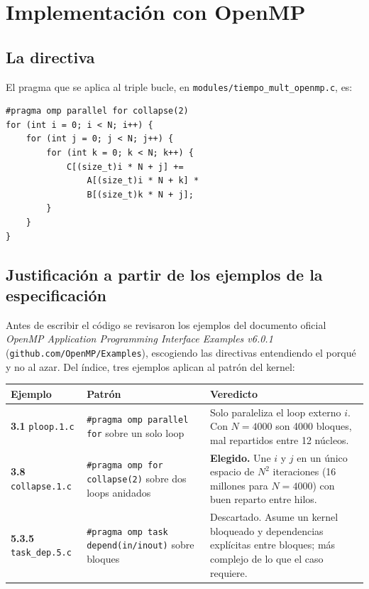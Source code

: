 \section{Implementación con OpenMP}

\subsection{La directiva}

El pragma que se aplica al triple bucle, en \texttt{modules/tiempo\_mult\_openmp.c}, es:

\begin{verbatim}
#pragma omp parallel for collapse(2)
for (int i = 0; i < N; i++) {
    for (int j = 0; j < N; j++) {
        for (int k = 0; k < N; k++) {
            C[(size_t)i * N + j] +=
                A[(size_t)i * N + k] *
                B[(size_t)k * N + j];
        }
    }
}
\end{verbatim}

\subsection{Justificación a partir de los ejemplos de la especificación}

Antes de escribir el código se revisaron los ejemplos del documento oficial \textit{OpenMP Application Programming Interface Examples v6.0.1} (\texttt{github.com/OpenMP/Examples}), escogiendo las directivas entendiendo el porqué y no al azar. Del índice, tres ejemplos aplican al patrón del kernel:

\begin{center}
\begin{tabular}{|l|p{5.5cm}|p{6.5cm}|}
\hline
\textbf{Ejemplo} & \textbf{Patrón} & \textbf{Veredicto} \\
\hline
\textbf{3.1} \texttt{ploop.1.c} &
\texttt{\#pragma omp parallel for} sobre un solo loop &
Solo paraleliza el loop externo $i$. Con $N=4000$ son 4000 bloques, mal repartidos entre 12 núcleos. \\
\hline
\textbf{3.8} \texttt{collapse.1.c} &
\texttt{\#pragma omp for collapse(2)} sobre dos loops anidados &
\textbf{Elegido.} Une $i$ y $j$ en un único espacio de $N^2$ iteraciones (16 millones para $N=4000$) con buen reparto entre hilos. \\
\hline
\textbf{5.3.5} \texttt{task\_dep.5.c} &
\texttt{\#pragma omp task depend(in/inout)} sobre bloques &
Descartado. Asume un kernel bloqueado y dependencias explícitas entre bloques; más complejo de lo que el caso requiere. \\
\hline
\end{tabular}
\end{center}

